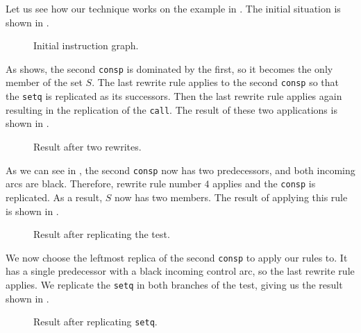 Let us see how our technique works on the example in
.  The initial situation is shown in
.

\begin{figure}
\begin{center}
\end{center}
\caption{\label{fig-rewrite-1}
Initial instruction graph.}
\end{figure}

As  shows, the second \texttt{consp} is
dominated by the first, so it becomes the only member of the set $S$.
The last rewrite rule applies to the second \texttt{consp} so that the
\texttt{setq} is replicated as its successors.  Then the last rewrite
rule applies again resulting in the replication of the \texttt{call}.
The result of these two applications is shown in .

\begin{figure}
\begin{center}
\end{center}
\caption{\label{fig-rewrite-2}
Result after two rewrites.}
\end{figure}

As we can see in , the second \texttt{consp}
now has two predecessors, and both incoming arcs are black.
Therefore, rewrite rule number $4$ applies and the \texttt{consp} is
replicated.  As a result, $S$ now has two members.  The result of
applying this rule is shown in .

\begin{figure}
\begin{center}
\end{center}
\caption{\label{fig-rewrite-3}
Result after replicating the test.}
\end{figure}

We now choose the leftmost replica of the second \texttt{consp} to
apply our rules to.  It has a single predecessor with a black incoming
control arc, so the last rewrite rule applies.  We replicate the
\texttt{setq} in both branches of the test, giving us the result shown
in .

\begin{figure}
\begin{center}
\end{center}
\caption{\label{fig-rewrite-4}
Result after replicating \texttt{setq}.}
\end{figure}

